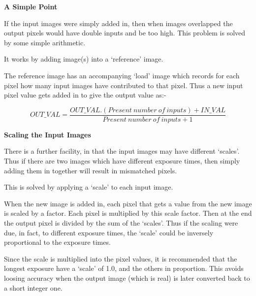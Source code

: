 {{{\hspace*{4ex} \bf A Simple Point}
                                                                               
 If the input images were simply added in, then when images overlapped
 the output pixels would have double inputs and be too high. This
 problem is solved by some simple arithmetic.
                                                                               
 It works by adding image(s) into a `reference' image.
                                                                               
 The reference image has an accompanying `load' image which records for
 each pixel how many input images have contributed to that pixel. Thus
 a new input pixel value gets added in to give the output value as:-
                                                                               
               
$$    OUT\_VAL =  \frac{OUT\_VAL.(Present~number~of~inputs) + IN\_VAL}{
                     Present~number~of~inputs + 1} $$
                                                                               
                                                                               
{\hspace*{4ex} \bf Scaling the Input Images}
                                                                               
 There is a further facility, in that the input images may have
 different `scales'. Thus if there are two images which have different
 exposure times, then simply adding them in together will result in
 mismatched pixels.
                                                                               
 This is solved by applying a `scale' to each input image.
                                                                               
 When the new image is added in, each pixel that gets a value from the
 new image is scaled by a factor. Each pixel is multiplied by this
 scale factor. Then at the end the output pixel is divided by the sum
 of the `scales'. Thus if the scaling were due, in fact, to different
 exposure times, the `scale' could be inversely proportional to the
 exposure times.
                                                                               
 Since the scale is multiplied into the pixel values, it is recommended
 that the longest exposure have a `scale' of 1.0, and the others in
 proportion. This avoids loosing accuracy when the output image (which
 is real) is later converted back to a short integer one.
                                                                               
}}
